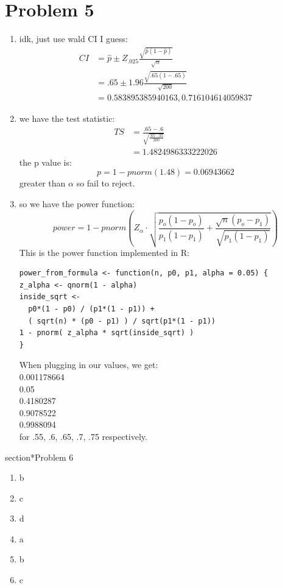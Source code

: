 \documentclass{article}
\begin{document}
\section*{Problem 5}
\begin{enumerate}
\item idk, just use wald CI I guess: \\
\begin{align*}
CI &= \hat{p} \pm Z_{.025}\frac{\sqrt{\hat{p}(1 - \hat{p})}}{\sqrt{n}} \\
&= .65 \pm 1.96 \frac{\sqrt{.65(1 - .65)}}{\sqrt{200}} \\
&= 0.583895385940163, 0.716104614059837
\end{align*}
\item we have the test statistic: \\
\begin{align*}
TS &= \frac{.65 - .6}{\sqrt{\frac{.65 \cdot .35}{200}}} \\
&= 1.4824986333222026
\end{align*}
the p value is: \\
\[
p = 1 - pnorm(1.48) = 0.06943662
\]
greater than $\alpha$ so fail to reject. \\
\item so we have the power function: \\
\[
power = 1 - pnorm(Z_\alpha \cdot \sqrt{\frac{p_o(1 - p_o)}{p_1(1 - p_1)} + \frac{\sqrt{n}(p_o - p_1)}{\sqrt{p_1(1 - p_1)}}})
\]
This is the power function implemented in R: \\
\begin{verbatim}
power_from_formula <- function(n, p0, p1, alpha = 0.05) {
z_alpha <- qnorm(1 - alpha)
inside_sqrt <- 
  p0*(1 - p0) / (p1*(1 - p1)) +
  ( sqrt(n) * (p0 - p1) ) / sqrt(p1*(1 - p1))
1 - pnorm( z_alpha * sqrt(inside_sqrt) )
}
\end{verbatim}
When plugging in our values, we get: \\
0.001178664 \\
0.05 \\
0.4180287 \\
0.9078522 \\
0.9988094 \\
for .55, .6, .65, .7, .75 respectively. \\
\end{enumerate}
section*{Problem 6}
\begin{enumerate}
\item b \\
\item c \\
\item d \\
\item a \\
\item b \\
\item c \\
\end{enumerate}
\end{document}
